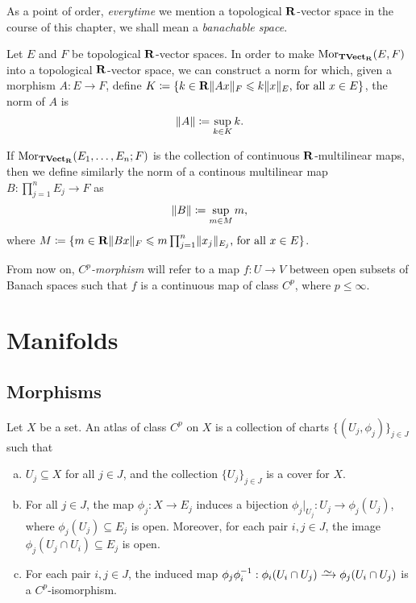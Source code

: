 As a point of order, \emph{everytime} we mention a topological \(\mathbf{R}\)-vector
space in the course of this chapter, we shall mean a \emph{banachable space}.

\begin{definition}
\label{def:norm-morphism-TopVect}
Let \(E\) and \(F\) be topological \(\mathbf{R}\)-vector spaces. In order to make
\(\operatorname{Mor}_{{\textbf{TVect}}_{\mathbf{R}}}(E, F)\) into a topological \(\mathbf{R}\)-vector space, we can
construct a norm for which, given a morphism \(A: E \to F\), define \(K \coloneq
\{k \in \mathbf{R} \relax \lVert Ax\rVert_{F} \leqslant k \lVert x\rVert_E \text{, for all } x \in E\}\), the
norm of \(A\) is
\[
  \lVert A\rVert \coloneq \sup_{k \in K} k.
\]

If \(\operatorname{Mor}_{{\textbf{TVect}}_{\mathbf{R}}}(E_1, \dots, E_n; F)\) is the collection of continuous
\(\mathbf{R}\)-multilinear maps, then we define similarly the norm of a continous
multilinear map \(B: \prod_{j=1}^n E_j \to F\) as
\[
  \lVert B\rVert \coloneq \sup_{m \in M} m,
\]
where \(M \coloneq \{m \in \mathbf{R} \relax \lVert Bx\rVert_F \leqslant m \prod_{j=1}^n
\lVert x_j\rVert_{E_j} \text{, for all } x \in E\}\).
\end{definition}

\begin{remark}
\label{rm:Cp-morphism}
From now on, \emph{\(C^p\)-morphism} will refer to a map \(f: U \to V\) between
open subsets of Banach spaces such that \(f\) is a continuous map of class
\(C^p\), where \(p \leq \infty\).
\end{remark}

\section{Manifolds}

\subsection{Morphisms}

\begin{definition}[Atlas]
\label{def:Cp-atlas}
Let \(X\) be a set. An atlas of class \(C^p\) on \(X\) is a collection of charts
\(\{(U_{j}, \phi_j)\}_{j \in J}\) such that
\begin{enumerate}[(a)]\setlength\itemsep{0em}
\item \(U_j \subseteq X\) for all \(j \in J\), and the collection \(\{U_{j}\}_{j
  \in J}\) is a cover for \(X\).

\item For all \(j \in J\), the map \(\phi_j: X \to E_j\) induces a bijection
  \(\phi_j|_{U_j}: U_j \to \phi_j(U_j)\), where \(\phi_j(U_j) \subseteq E_j\) is
  open. Moreover, for each pair \(i, j \in J\), the image \(\phi_j(U_j \cap U_i)
  \subseteq E_j\) is open.

\item For each pair \(i, j \in J\), the induced map \(\phi_j \phi_i^{-1}:
  \phi_i(U_i \cap U_j) \isoto \phi_j(U_i \cap U_j)\) is a \(C^p\)-isomorphism.
\end{enumerate}
\end{definition}

